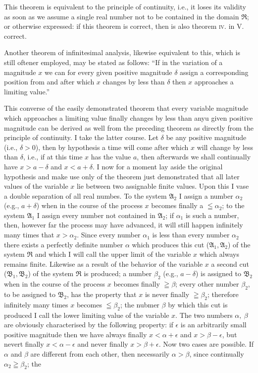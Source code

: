 \documentclass[oneside,12pt]{book}
\begin{document}
This theorem is equivalent to the principle of continuity, i.e., it loses its validity as soon as we assume a single real number not to be contained in the domain $\Re$; or otherwise expressed: if this theorem is correct, then is also theorem \textsc{iv.} in V. correct. \par 

Another theorem of infinitesimal analysis, likewise equivalent to this, which is still oftener employed, may be stated as follows: ``If in the variation of a magnitude $x$ we can for every given positive magnitude $\delta$ assign a corresponding position from and after which $x$ changes by less than $\delta$ then $x$ approaches a limiting value.'' \par 

This converse of the easily demonstrated theorem that every variable magnitude which approaches a limiting value finally changes by less than anyu given positive magnitude can be derived as well from the preceding theorem as directly from the principle of continuity. I take the latter course. Let $\delta$ be any positive magnitude (i.e., $\delta>0$), then by hypothesis a time will come after which $x$ will change by less than $\delta$, i.e., if at this time $x$ has the value $a$, then afterwards we shall continually have $x>a-\delta$ and $x<a+\delta$. I now for a moment lay aside the original hypothesis and make use only of the theorem just demonstrated that all later values of the variable $x$ lie between two assignable finite values. Upon this I vase a double separation of all real numbes. To the system $\mathfrak{A}_2$ I assign a number $\alpha_2$ (e.g., $a+\delta$) when in the course of the process $x$ becomes finally a $\leqq\alpha_2$; to the system $\mathfrak{A}_1$ I assign every number not contained in $\mathfrak{A}_2$; if $\alpha_1$ is such a number, then, however far the process may have advanced, it will still happen infinitely many times that $x>\alpha_2$. Since every number $\alpha_1$ is less than every number $\alpha_2$ there exists a perfectly definite number $\alpha$ which produces this cut ($\mathfrak{A}_1,\mathfrak{A}_2$) of the system $\Re$ and which I will call the upper limit of the variable $x$ which always remains finite. Likewise as a result of the behavior of the variable $x$ a second cut ($\mathfrak{B}_1,\mathfrak{B}_2$) of the system $\Re$ is produced; a number $\beta_2$ (e.g., $a-\delta$) is assigned to $\mathfrak{B}_2$ when in the course of the process $x$ becomes finally $\geqq\beta$; every other number $\beta_2$, to be assigned to $\mathfrak{B}_2$, has the property that $x$ is never finally $\geqq\beta_2$; therefore infinitely many times $x$ becomes $\leqq\beta_2$; the nubmer $\beta$ by which this cut is produced I call the lower limiting value of the variable $x$. The two numbers $\alpha,\ \beta$ are obviously characterised by the following property: if $\epsilon$ is an arbitrarily small positive magnitude then we have always finally $x<\alpha+\epsilon$ and $x>\beta-\epsilon$, but nevert finally $x<\alpha-\epsilon$ and never finally $x>\beta+\epsilon$. Now two cases are possible. If $\alpha$ and $\beta$ are different from each other, then necessarily $\alpha>\beta$, since continually$\alpha_2\geqq\beta_2$; the 
\end{document}
